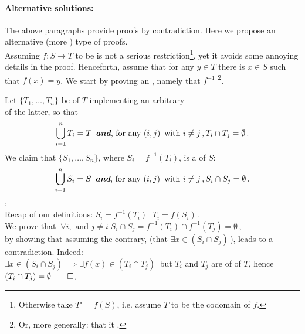 \paragraph{Alternative solutions:}{
The above paragraphs provide proofs by contradiction. Here we propose an alternative (more ) type of proofs.\\

Assuming $f : S \rightarrow T$ to be  is not a serious restriction\footnote{Otherwise take $T' = f(S)$, i.e. assume $T$ to be the codomain of $f$.}, yet it avoids some annoying details in the proof. Henceforth, assume that for any $y \in T$ there is $x \in S$ such that $f(x) = y$. We start by proving an , namely that $f^{-1}$ \footnote{Or, more generally: that it .}.

Let $\{T_1, \ldots , T_n\}$ be  of $T$ implementing an arbitrary\\  of the latter, so that  
$$ \bigcup\limits_{i=1}^{n} T_i = T\, \text{ \textit{\textbf{and}}, for any } (i,j)\, \text{ with } i \neq j\,, T_i \cap T_j = \emptyset\,.$$
We claim that $\{S_1, \ldots , S_n\}$, where   $S_i = f^{-1}(T_i)$, is a  of $S$:
$$ \bigcup\limits_{i=1}^{n} S_i = S\, \text{ \textit{\textbf{and}}, for any } (i,j)\, \text{ with } i \neq j\,, S_i \cap S_j = \emptyset\,.$$
:\\
Recap of our definitions: $S_i = f^{-1}(T_i)\;$  $T_i = f(S_i)\,.$\\
 We prove that $\:\forall i, \text{ and } j \neq i \;  S_i \cap S_j =  f^{-1}(T_i) \cap f^{-1}(T_j) = \emptyset\,,$\\ 
by showing that assuming the contrary, (that $\exists x \in (S_i \cap S_j)\,$), leads to a contradiction. Indeed:\\
$\exists x \in (S_i \cap S_j) \implies \exists f(x) \in (T_i \cap T_j)\:$ but $T_i$ and $T_j$ are  of  of $T$, hence $(T_i \cap T_j) = \emptyset \qed$.\\

}
